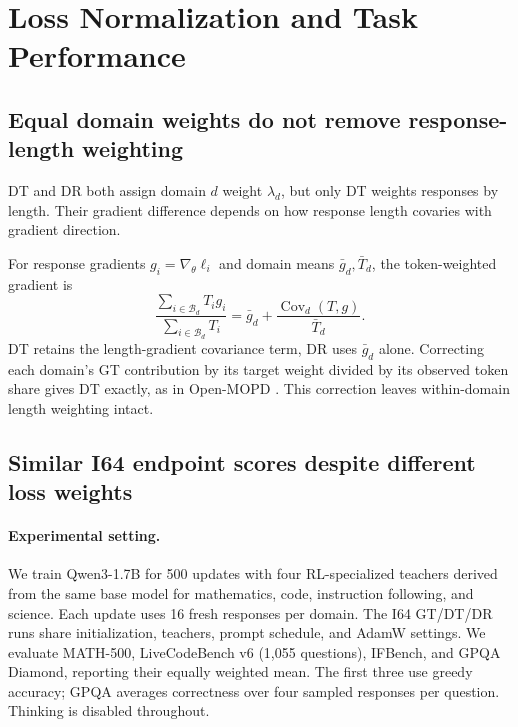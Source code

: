 \section{Loss Normalization and Task Performance}
\label{sec:normalization}

\subsection{Equal domain weights do not remove response-length weighting}

DT and DR both assign domain $d$ weight $\lambda_d$, but only DT weights responses by length. Their gradient difference depends on how response length covaries with gradient direction.

For response gradients $g_i=\nabla_\theta\ell_i$ and domain means $\bar g_d,\bar T_d$, the token-weighted gradient is
\begin{equation}
\frac{\sum_{i\in\mathcal B_d}T_i g_i}{\sum_{i\in\mathcal B_d}T_i}
=\bar g_d+\frac{\operatorname{Cov}_d(T,g)}{\bar T_d}.
\label{eq:weighting}
\end{equation}
DT retains the length-gradient covariance term, DR uses $\bar g_d$ alone. Correcting each domain's GT contribution by its target weight divided by its observed token share gives DT exactly, as in Open-MOPD \citep{gao2026openmopddiagnosingfixingcapability}. This correction leaves within-domain length weighting intact.

\subsection{Similar I64 endpoint scores despite different loss weights}

\paragraph{Experimental setting.}
We train Qwen3-1.7B for 500 updates with four RL-specialized teachers derived from the same base model for mathematics, code, instruction following, and science. Each update uses 16 fresh responses per domain. The I64 GT/DT/DR runs share initialization, teachers, prompt schedule, and AdamW settings. We evaluate MATH-500, LiveCodeBench v6 (1,055 questions), IFBench, and GPQA Diamond, reporting their equally weighted mean. The first three use greedy accuracy; GPQA averages correctness over four sampled responses per question. Thinking is disabled throughout.

